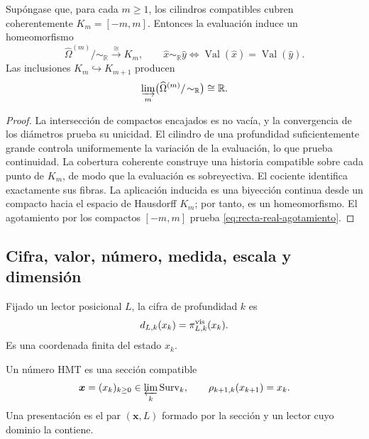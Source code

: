 \begin{theorem}
\label{thm:recta-real-cociente-historias}
Supóngase que, para cada \(m\geq1\), los cilindros compatibles cubren
coherentemente \(K_m=[-m,m]\). Entonces la evaluación induce un
homeomorfismo
\begin{equation}
 \widehat\Omega^{(m)}/\!\sim_{\mathbb R}
 \xrightarrow{\;\cong\;}K_m,
 \qquad
 \widehat x\sim_{\mathbb R}\widehat y
 \Longleftrightarrow
 \operatorname{Val}(\widehat x)
 =\operatorname{Val}(\widehat y).
 \label{eq:homeomorfismo-cociente-real}
\end{equation}
Las inclusiones \(K_m\hookrightarrow K_{m+1}\) producen
\begin{equation}
 \varinjlim_m
 \bigl(\widehat\Omega^{(m)}/\!\sim_{\mathbb R}\bigr)
 \cong\mathbb R.
 \label{eq:recta-real-agotamiento}
\end{equation}
\end{theorem}

\begin{proof}
La intersección de compactos encajados es no vacía, y la convergencia de los
diámetros prueba su unicidad. El cilindro de una profundidad suficientemente
grande controla uniformemente la variación de la evaluación, lo que prueba
continuidad. La cobertura coherente construye una historia compatible sobre
cada punto de \(K_m\), de modo que la evaluación es sobreyectiva. El
cociente identifica exactamente sus fibras. La aplicación inducida es una
biyección continua desde un compacto hacia el espacio de Hausdorff \(K_m\);
por tanto, es un homeomorfismo. El agotamiento por los compactos
\([-m,m]\) prueba \eqref{eq:recta-real-agotamiento}.
\end{proof}

\subsection{Cifra, valor, número, medida, escala y dimensión}

\begin{definition}[Cifra]
Fijado un lector posicional \(L\), la cifra de profundidad \(k\) es
\begin{equation}
 d_{L,k}(x_k)=\pi_{L,k}^{\rm vis}(x_k).
 \label{eq:definicion-cifra}
\end{equation}
Es una coordenada finita del estado \(x_k\).
\end{definition}

\begin{definition}
Un número HMT es una sección compatible
\begin{equation}
 \boldsymbol x=(x_k)_{k\geq0}\in
 \varprojlim_k\operatorname{Surv}_k,
 \qquad \rho_{k+1,k}(x_{k+1})=x_k.
 \label{eq:definicion-numero-hmt}
\end{equation}
Una presentación es el par \((\boldsymbol x,L)\) formado por la sección y un
lector cuyo dominio la contiene.
\end{definition}

